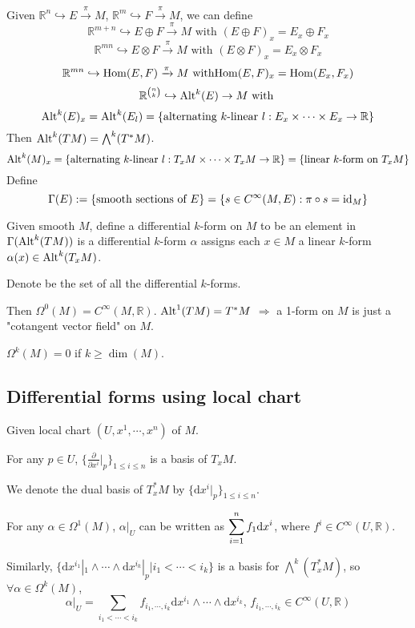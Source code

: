 Given  $ \mathbb{R}^n\hookrightarrow E\xrightarrow{\pi}M $,  $ \mathbb{R}^m\hookrightarrow F\xrightarrow{\pi}M $, we can define
\[\mathbb{R}^{m+n}\hookrightarrow E\oplus F\xrightarrow{\pi}M\text{ with }(E\oplus F)_x=E_x\oplus F_x\]
\[\mathbb{R}^{mn}\hookrightarrow E\otimes F\xrightarrow{\pi}M\text{ with }(E\otimes F)_x=E_x\otimes F_x\]
\[\mathbb{R}^{mn}\hookrightarrow \Hom(E,F)\xrightarrow{\pi}M\text{\ with}\Hom(E,F)_x=\Hom(E_x,F_x)\]
\[\mathbb{R}^{\binom{n }{k }}\hookrightarrow \mathrm{Alt}^k(E)\rightarrow M \text{ with }\]
\[\mathrm{Alt}^k(E)_x=\mathrm{Alt}^k(E_l)=\{\text{alternating  $ k $-linear } l:E_x\times \cdots\times E_x\rightarrow \mathbb{R}\}\]
Then  $ \mathrm{Alt}^k(TM)=\bigwedge^k(T^*M) $.
\[\mathrm{Alt}^k(M)_x=\{\text{alternating  $ k $-linear } l:T_xM\times \cdots\times T_xM\rightarrow \mathbb{R}\}=\{\text{linear  $ k $-form on }T_xM\}\]
Define
\[\name{$ \Gamma(E) $}:=\{\text{smooth sections of }E\}=\{s\in C^\infty(M,E):\pi\circ s=\mathrm{id}_M\}\]
\begin{definition}
    Given smooth  $ M $, define a differential  $ k $-form on  $ M $ to be an element in  $ \Gamma(\mathrm{Alt}^k(TM)) $    is a differential  $ k $-form  $ \alpha $ assigns each  $ x\in M $ a linear  $ k $-form  $ \alpha(x)\in \mathrm{Alt}^k(T_xM) $.
\end{definition}
Denote  be the set of all the differential  $ k $-forms.

Then  $ \Omega^0(M)=C^\infty(M,\mathbb{R}) $.  $ \mathrm{Alt}^1(TM)=T^*M $ $ \Rightarrow  $ a 1-form on  $ M $ is just a "cotangent vector field" on  $ M $.

 $ \Omega^k(M)=0 $ if  $ k \geq \dim (M) $.
\subsection{Differential forms using local chart}
Given local chart  $ (U,x^1,\cdots,x^n) $ of  $ M $.

For any  $ p\in U $,  $ \{\frac{\partial}{\partial x^i}|_p\}_{1 \leq i \leq n} $ is a basis of  $ T_xM $.

We  denote the dual basis of  $ T_x^*M $ by  $ \{\mathrm{d}x^i|_p\}_{1 \leq i \leq n} $.

For any  $ \alpha\in \Omega^1(M) $,  $ \alpha|_U $ can be written as  $ \displaystyle\sum_{i=1}^nf_1\mathrm{d}x^i $, where  $ f^i\in C^\infty(U,\mathbb{R}) $.

Similarly,  $ \{\mathrm{d} x^{i_1}|_1\wedge\cdots\wedge\mathrm{d}x^{i_k}|_p|i_1<\cdots<i_k\} $ is a basis for  $ \bigwedge^k(T_x^*M) $, so  $ \forall \alpha\in \Omega^k(M) $,
\[\alpha|_U=\sum_{i_1<\cdots<i_k}f_{i_1,\cdots,i_k}\mathrm{d} x^{i_1}\wedge\cdots\wedge\mathrm{d} x^{i_k},\,f_{i_1,\cdots,i_k}\in C^\infty(U,\mathbb{R})\]